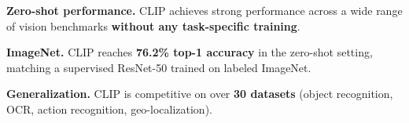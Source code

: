 \textbf{Zero-shot performance.}
CLIP achieves strong performance across a wide range of vision benchmarks
\textbf{without any task-specific training}.

\textbf{ImageNet.}
CLIP reaches \textbf{76.2\% top-1 accuracy} in the zero-shot setting,
matching a supervised ResNet-50 trained on labeled ImageNet.

\textbf{Generalization.}
CLIP is competitive on over \textbf{30 datasets}
(object recognition, OCR, action recognition, geo-localization).
